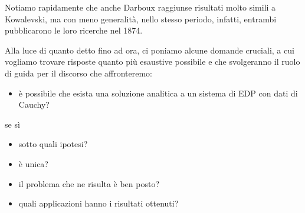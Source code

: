 Notiamo rapidamente che anche Darboux raggiunse risultati molto simili a Kowalevski, ma con meno generalità, nello stesso periodo, infatti, entrambi pubblicarono le loro ricerche nel 1874.

Alla luce di quanto detto fino ad ora, ci poniamo alcune domande cruciali, a cui vogliamo trovare risposte quanto più esaustive possibile e che svolgeranno il ruolo di guida per il discorso che affronteremo:
\begin{itemize}
\item è possibile che esista una soluzione analitica a un sistema di EDP con dati di Cauchy?
\end{itemize}
se sì
\begin{itemize}
\item sotto quali ipotesi?
\item è unica?
\item il problema che ne risulta è ben posto?
\item quali applicazioni hanno i risultati ottenuti?
\end{itemize}



